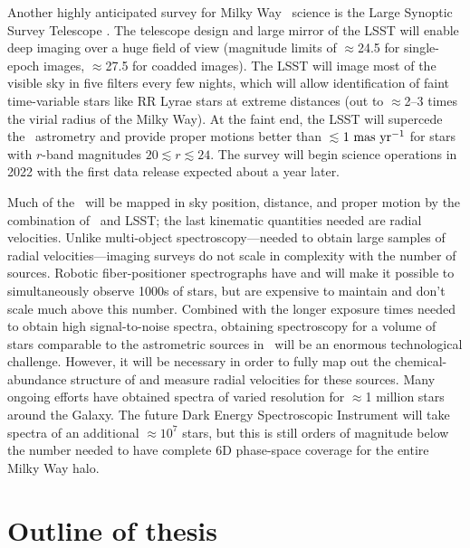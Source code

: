 Another highly anticipated survey for Milky Way \mwhalo\ science is the Large
Synoptic Survey Telescope \citep[LSST;][]{lsstsciencebook}. The telescope design
and large mirror of the LSST will enable deep imaging over a huge field of view
(magnitude limits of $\approx$24.5 for single-epoch images, $\approx$27.5 for
coadded images). The LSST will image most of the visible sky in five filters
every few nights, which will allow identification of faint time-variable stars
like RR Lyrae stars at extreme distances (out to $\approx$2--3 times the virial
radius of the Milky Way). At the faint end, the LSST will supercede the \gaia\
astrometry and provide proper motions better than $\lesssim$$1~{\rm mas}~{\rm
yr}^{-1}$ for stars with $r$-band magnitudes $20 \lesssim r \lesssim 24$. The
survey will begin science operations in 2022 with the first data release
expected about a year later.

Much of the \mwhalo\ will be mapped in sky position, distance, and proper motion
by the combination of \gaia\ and LSST; the last kinematic quantities needed are
radial velocities. Unlike multi-object spectroscopy---needed to obtain large
samples of radial velocities---imaging surveys do not scale in complexity with
the number of sources. Robotic fiber-positioner spectrographs
\citep{saunders12} have and will make it possible to simultaneously observe
1000s of stars, but are expensive to maintain and don't scale much above this
number. Combined with the longer exposure times needed to obtain high
signal-to-noise spectra, obtaining spectroscopy for a volume of stars comparable
to the astrometric sources in \gaia\ will be an enormous technological
challenge. However, it will be necessary in order to fully map out the
chemical-abundance structure of and measure radial velocities for these sources.
Many ongoing efforts \citep[e.g.,][]{rave06, segue08, apogee15, galah15} have
obtained spectra of varied resolution for $\approx$1 million stars around the
Galaxy. The future Dark Energy Spectroscopic Instrument
\citep[DESI;][]{desi-whitepaper} will take spectra of an additional
$\approx$$10^7$ stars, but this is still orders of magnitude below the number
needed to have complete 6D phase-space coverage for the entire Milky Way halo.


\section{Outline of thesis}


